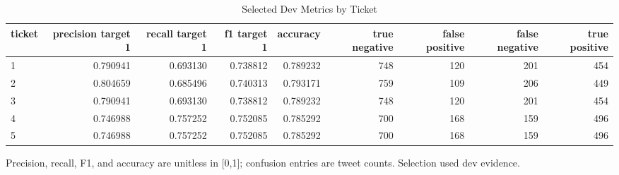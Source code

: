 \begin{table}[t]
\centering
\caption{Selected Dev Metrics by Ticket}
\label{tab:dev_metrics}
\begin{adjustbox}{max width=\textwidth}
\scriptsize
\begin{tabular}{lrrrrrrrr}
\hline
ticket & precision target 1 & recall target 1 & f1 target 1 & accuracy & true negative & false positive & false negative & true positive \\
\hline
1 & 0.790941 & 0.693130 & 0.738812 & 0.789232 & 748 & 120 & 201 & 454 \\
2 & 0.804659 & 0.685496 & 0.740313 & 0.793171 & 759 & 109 & 206 & 449 \\
3 & 0.790941 & 0.693130 & 0.738812 & 0.789232 & 748 & 120 & 201 & 454 \\
4 & 0.746988 & 0.757252 & 0.752085 & 0.785292 & 700 & 168 & 159 & 496 \\
5 & 0.746988 & 0.757252 & 0.752085 & 0.785292 & 700 & 168 & 159 & 496 \\
\hline
\end{tabular}
\end{adjustbox}
\par\footnotesize{Precision, recall, F1, and accuracy are unitless in [0,1]; confusion entries are tweet counts. Selection used dev evidence.}
\end{table}
